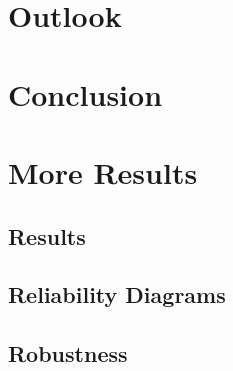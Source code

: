 \documentclass[a4paper, 11pt, oneside]{scrartcl}
\theoremstyle{break}
\numberwithin{equation}{section}
\begin{document}
	\section{Outlook}

	\section{Conclusion}

	\newpage
	\printbibliography
	\newpage
	\appendix
	\section{More Results}
		\subsection{Results}

		\subsection{Reliability Diagrams}

		\subsection{Robustness}
\end{document}
